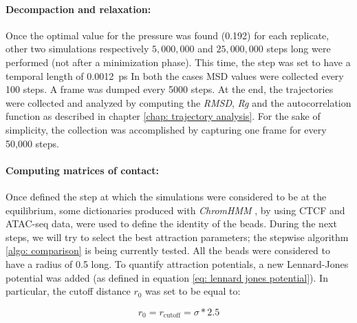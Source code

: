 
\paragraph{Decompaction and relaxation:}

Once the optimal value for the pressure was found (0.192) %
for each replicate, other two simulations respectively $5,000,000$ and $25,000,000$ steps long were performed (not after a minimization phase). This time, the step was set to have a temporal length of \SI{0.0012}{\pico\second} In both the cases MSD values were collected every 100 steps. A frame was dumped every 5000 steps. At the end, the trajectories were collected and analyzed by computing the \textit{RMSD}, \textit{Rg} and the autocorrelation function as described in chapter \ref{chap: trajectory analysis}. For the sake of simplicity, the collection was accomplished by capturing one frame for every 50,000 steps.


\paragraph{Computing matrices of contact:}

Once defined the step at which the simulations were considered to be at the equilibrium, some dictionaries produced with \textit{ChromHMM}
\cite{chilledhousevibesLearningChromatinStates2015,ernstChromatinstateDiscoveryGenome2017}
, by using CTCF and ATAC-seq data, were used to define the identity of the beads. During the next steps, we will try to select the best attraction parameters; the stepwise algorithm \ref{algo: comparison} is being currently tested. All the beads were considered to have a radius of 0.5 %
long. To quantify attraction potentials, a new Lennard-Jones potential was added (as defined in equation \ref{eq: lennard jones potential}). In particular, the cutoff distance $r_0$ was set to be equal to:

$$
r_0 = r_{\text{cutoff}} = \sigma * 2.5
$$

